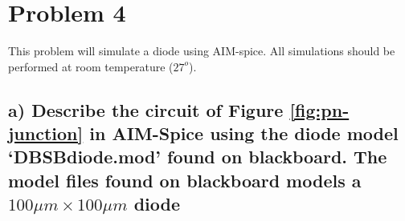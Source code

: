 \section{Problem 4}
This problem will simulate a diode using AIM-spice. All simulations should be performed
at room temperature ($27^o$).

\subsection*{a) Describe the circuit of Figure \ref*{fig:pn-junction} in AIM-Spice using the diode model ‘DBSBdiode.mod’ found on blackboard. The model files found on blackboard models a $100 \mu m \times 100 \mu m$ diode}

